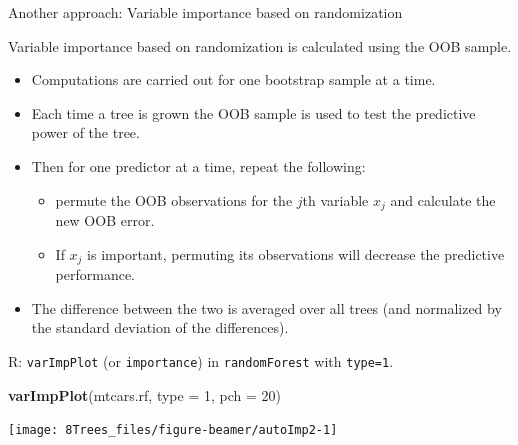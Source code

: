 \documentclass[10pt,ignorenonframetext,]{beamer}
\newenvironment{Shaded}{\begin{snugshade}}{\end{snugshade}}
\newcommand{\KeywordTok}[1]{\textcolor[rgb]{0.13,0.29,0.53}{\textbf{#1}}}
\newcommand{\DataTypeTok}[1]{\textcolor[rgb]{0.13,0.29,0.53}{#1}}
\newcommand{\DecValTok}[1]{\textcolor[rgb]{0.00,0.00,0.81}{#1}}
\newcommand{\NormalTok}[1]{#1}
\providecommand{\tightlist}{%
  \setlength{\itemsep}{0pt}\setlength{\parskip}{0pt}}
\begin{document}
\begin{frame}[fragile]

\begin{block}{Another approach: Variable importance based on
randomization}

\vspace{2mm}

Variable importance based on randomization is calculated using the OOB
sample.

\begin{itemize}
\tightlist
\item
  Computations are carried out for one bootstrap sample at a time.
\item
  Each time a tree is grown the OOB sample is used to test the
  predictive power of the tree.
\item
  Then for one predictor at a time, repeat the following:

  \begin{itemize}
  \tightlist
  \item
    permute the OOB observations for the \(j\)th variable \(x_j\) and
    calculate the new OOB error.
  \item
    If \(x_j\) is important, permuting its observations will decrease
    the predictive performance.
  \end{itemize}
\item
  The difference between the two is averaged over all trees (and
  normalized by the standard deviation of the differences).
\end{itemize}

R: \texttt{varImpPlot} (or \texttt{importance}) in \texttt{randomForest}
with \texttt{type=1}.

\end{block}

\end{frame}

\begin{frame}[fragile]

\begin{Shaded}
\begin{Highlighting}[]
\KeywordTok{varImpPlot}\NormalTok{(mtcars.rf, }\DataTypeTok{type =} \DecValTok{1}\NormalTok{, }\DataTypeTok{pch =} \DecValTok{20}\NormalTok{)}
\end{Highlighting}
\end{Shaded}

\begin{center}\texttt{[image: 8Trees\_files/figure-beamer/autoImp2-1]} \end{center}

\end{frame}
\end{document}
